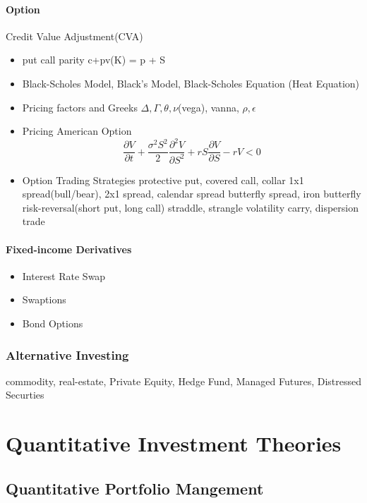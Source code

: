 \documentclass[11pt, openany]{book}              %
\begin{document}
\subsection{Option}

Credit Value Adjustment(CVA)

 \begin{itemize}
  	\item put call parity c+pv(K) = p + S
    \item Black-Scholes Model, Black's Model, Black-Scholes Equation (Heat Equation)
    \item Pricing factors and Greeks $\Delta,\Gamma, \theta, \nu$(vega), vanna, $\rho,\epsilon$ 
    \item Pricing American Option
    $$\frac{\partial V}{\partial t} + \frac{\sigma^2 S^2}{2} \frac{\partial^2 V}{\partial S^2}+ r S \frac{\partial V}{\partial S} - rV < 0 $$
    \item Option Trading Strategies
     \subitem protective put, covered call, collar
     \subitem 1x1 spread(bull/bear), 2x1 spread, calendar spread
     \subitem butterfly spread, iron butterfly
     \subitem risk-reversal(short put, long call)
     \subitem straddle, strangle
     \subitem volatility carry, dispersion trade
\end{itemize}

\subsection{Fixed-income Derivatives}
\begin{itemize}
	\item Interest Rate Swap
	\item Swaptions
	\item Bond Options
\end{itemize}


\section{Alternative Investing}

commodity, real-estate, Private Equity, Hedge Fund, Managed Futures, Distressed Securties

\part{Quantitative Investment Theories}

\chapter{Quantitative Portfolio Mangement}
\end{document}
